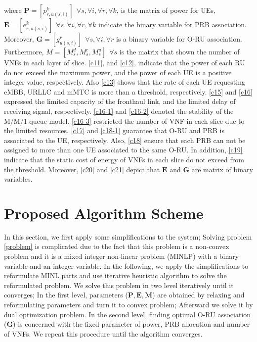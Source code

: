 \documentclass[conference]{IEEEtran}
\begin{document}
where $\boldsymbol{P} =[p_{r,u(s,i)}^{k}] \:\: \forall s , \forall i, \forall r, \forall k $, is the matrix of power for UEs, $\boldsymbol{E} =[e_{r,u(s,i)}^k] \:\: \forall s , \forall i, \forall r, \forall k$ indicate the binary variable for PRB association. Moreover, $\boldsymbol{G} =[g_{u(s,i)}^r] \:\: \forall s , \forall i, \forall r$ is a binary variable for O-RU association. Furthermore, $M = [M_s^d, M_s^c, M_s^u] \:\: \forall s$ is the matrix that shown the number of VNFs in each layer of slice.
\eqref{c11}, and \eqref{c12}, indicate that the power of each RU do not exceed the maximum power, and the power of each UE is a positive integer value, respectively. 
Also \eqref{c13} shows that the rate of each UE requesting eMBB, URLLC and mMTC is more than a threshold, respectively.
\eqref{c15} and \eqref{c16} expressed the limited capacity of the fronthaul link, and the limited delay of receiving signal, respectively.
\eqref{c16-1} and \eqref{c16-2} denoted the stability of the M/M/1 queue model.
\eqref{c16-3} restricted the number of VNF in each slice due to the limited resources.
\eqref{c17} and \eqref{c18-1} guarantee that O-RU and PRB is associated to the UE, respectively.
Also, \eqref{c18} ensure that each PRB can not be assigned to more than one UE associated to the same O-RU.
In addition, \eqref{c19} indicate that the static cost of energy of VNFs in each slice do not exceed from the threshold. 
Moreover, \eqref{c20} and \eqref{c21} depict that $\boldsymbol{E}$ and $\boldsymbol{G}$ are matrix of binary variables.
\section{Proposed Algorithm Scheme}\label{proAlg}
In this section, we first apply some simplifications to the system; Solving problem \eqref{problem} is complicated due to the fact that this problem is 
a non-convex problem and it is a 
mixed integer non-linear problem (MINLP) with a binary variable and an integer variable. 
In the following, we apply the simplifications to reformulate MINL parts and use iterative heuristic algorithm to solve the reformulated problem.
We solve this problem in two level iteratively until it converges; In the first level,
parameters ($\boldsymbol{P}, \boldsymbol{E}, \boldsymbol{M}$) are obtained by relaxing and reformulating parameters and turn it to convex problem; Afterward we solve it by dual optimization problem.
In the second level, finding optimal O-RU association ($ \boldsymbol{G}$) is concerned with the fixed parameter of power, PRB allocation and number of VNFs.   
We repeat this procedure until the algorithm converges.
\end{document}
